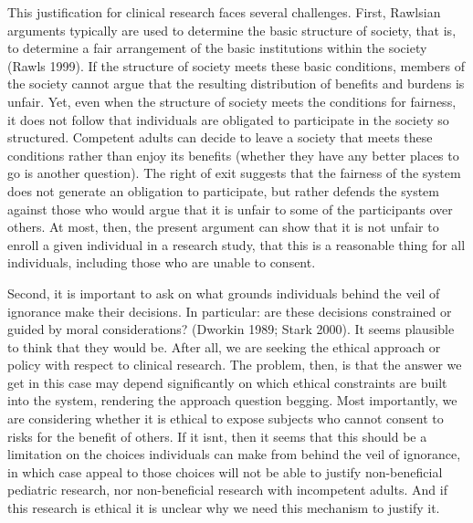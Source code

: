 \documentclass[12p]{article}
\begin{document}
This justification for clinical research faces several challenges. First, Rawlsian arguments typically are used to determine the basic structure of society, that is, to determine a fair arrangement of the basic institutions within the society (Rawls 1999). If the structure of society meets these basic conditions, members of the society cannot argue that the resulting distribution of benefits and burdens is unfair. Yet, even when the structure of society meets the conditions for fairness, it does not follow that individuals are obligated to participate in the society so structured. Competent adults can decide to leave a society that meets these conditions rather than enjoy its benefits (whether they have any better places to go is another question). The right of exit suggests that the fairness of the system does not generate an obligation to participate, but rather defends the system against those who would argue that it is unfair to some of the participants over others. At most, then, the present argument can show that it is not unfair to enroll a given individual in a research study, that this is a reasonable thing for all individuals, including those who are unable to consent.

Second, it is important to ask on what grounds individuals behind the veil of ignorance make their decisions. In particular: are these decisions constrained or guided by moral considerations? (Dworkin 1989; Stark 2000). It seems plausible to think that they would be. After all, we are seeking the ethical approach or policy with respect to clinical research. The problem, then, is that the answer we get in this case may depend significantly on which ethical constraints are built into the system, rendering the approach question begging. Most importantly, we are considering whether it is ethical to expose subjects who cannot consent to risks for the benefit of others. If it isnt, then it seems that this should be a limitation on the choices individuals can make from behind the veil of ignorance, in which case appeal to those choices will not be able to justify non-beneficial pediatric research, nor non-beneficial research with incompetent adults. And if this research is ethical it is unclear why we need this mechanism to justify it.
\end{document}
